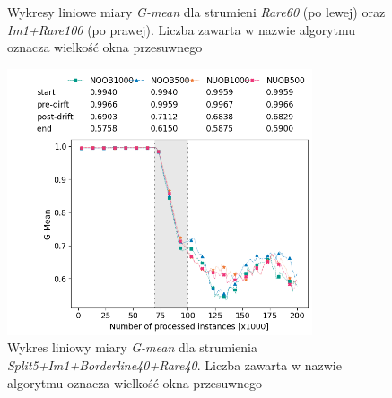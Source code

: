 \begin{figure}[h]
    \centering
    \qquad
    \caption{Wykresy liniowe miary \textit{G-mean} dla strumieni \textit{Rare60} (po lewej) oraz \textit{Im1+Rare100} (po prawej). Liczba zawarta w nazwie algorytmu oznacza wielkość okna przesuwnego}\label{Figure:WindowParametrization1}
\end{figure}

\begin{figure}[h]
    \centering
    \includegraphics[width=9cm]{figures/split5im1borderline40rare40_window.png}
    \caption{Wykres liniowy miary \textit{G-mean} dla strumienia \textit{Split5+Im1+Borderline40+Rare40}. Liczba zawarta w nazwie algorytmu oznacza wielkość okna przesuwnego}\label{Figure:WindowParametrization2}
\end{figure}

